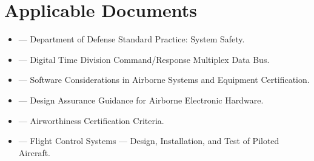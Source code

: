 \section{Applicable Documents}
\begin{itemize}
  \item {} — Department of Defense Standard Practice: System Safety.
  \item {} — Digital Time Division Command/Response Multiplex Data Bus.
  \item {} — Software Considerations in Airborne Systems and Equipment Certification.
  \item {} — Design Assurance Guidance for Airborne Electronic Hardware.
  \item {} — Airworthiness Certification Criteria.
  \item {} — Flight Control Systems — Design, Installation, and Test of Piloted Aircraft.
\end{itemize}

\newpage

